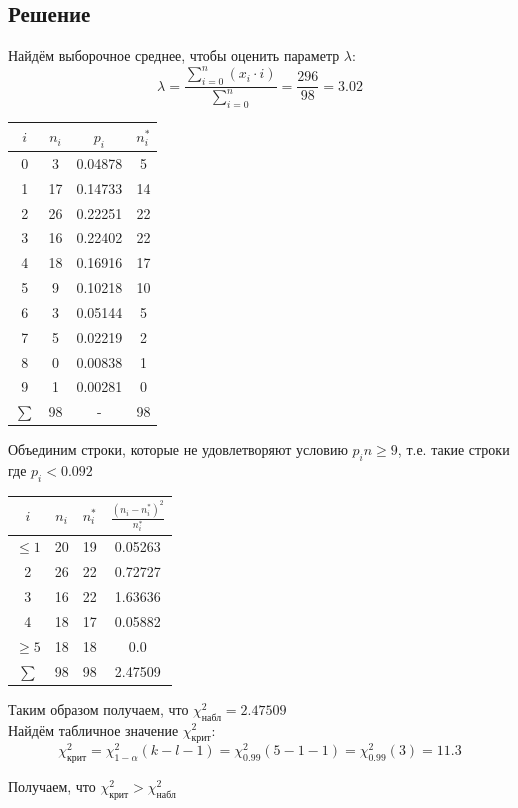 \documentclass[12pt,a4paper]{report}
\begin{document}
\subsection*{Решение}
Найдём выборочное среднее, чтобы оценить параметр $\lambda$:
$$\lambda=\frac{\sum_{i=0}^{n}(x_i\cdot i)}{\sum_{i=0}^{n}}=\frac{296}{98}=3.02$$
\hfill\break
\begin{center}
    \begin{tabular}{|c|c|c|c|}
        \hline
        $i$ & $n_i$ & $p_i$ & $n_i^*$ \\
        \hline
        0 & 3 & 0.04878 & 5 \\
        \hline
        1 & 17 & 0.14733 & 14 \\ %
        \hline
        2 & 26 & 0.22251 & 22 \\
        \hline
        3 & 16 & 0.22402 & 22 \\
        \hline
        4 & 18 & 0.16916 & 17 \\
        \hline
        5 & 9 & 0.10218 & 10 \\
        \hline
        6 & 3 & 0.05144 & 5 \\
        \hline
        7 & 5 & 0.02219 & 2 \\
        \hline
        8 & 0 & 0.00838 & 1 \\
        \hline
        9 & 1 & 0.00281 & 0 \\
        \hline
        $\sum$ & 98 & - & 98 \\
        \hline
    \end{tabular}
\end{center}
Объединим строки, которые не удовлетворяют условию $p_in\geq 9$, т.е. такие строки где $p_i < 0.092$
\begin{center}
    \begin{tabular}{|c|c|c|c|}
        \hline
        $i$ & $n_i$ & $n_i^*$ & $\frac{(n_i-n_i^*)^2}{n_i^*}$ \\
        \hline
        $\leq 1$ & 20 & 19 & 0.05263 \\
        \hline
        2 & 26 & 22 & 0.72727 \\
        \hline
        3 & 16 & 22 & 1.63636 \\
        \hline
        4 & 18 & 17 & 0.05882 \\
        \hline
        $\geq 5$ & 18 & 18 & 0.0 \\
        \hline
        $\sum$ & 98 & 98 & 2.47509 \\
        \hline
    \end{tabular}
\end{center}
Таким образом получаем, что $\chi^2_\text{набл}=2.47509$\\
\hfill\break
Найдём табличное значение $\chi^2_\text{крит}$:
$$\chi^2_\text{крит}=\chi^2_{1-\alpha}(k-l-1)=\chi^2_{0.99}(5-1-1)=\chi^2_{0.99}(3)=11.3$$

Получаем, что $\chi^2_\text{крит} > \chi^2_\text{набл}$
\end{document}
